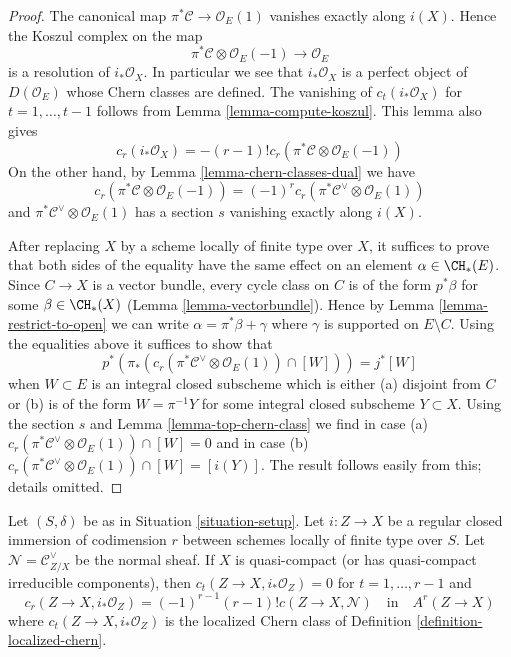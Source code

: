 \begin{proof}
The canonical map $\pi^*\mathcal{C} \to \mathcal{O}_E(1)$ vanishes
exactly along $i(X)$. Hence the Koszul complex on the map
$$
\pi^*\mathcal{C} \otimes \mathcal{O}_E(-1) \to \mathcal{O}_E
$$
is a resolution of $i_*\mathcal{O}_X$. In particular we see that
$i_*\mathcal{O}_X$ is a perfect object of $D(\mathcal{O}_E)$
whose Chern classes are defined. The vanishing of $c_t(i_*\mathcal{O}_X)$
for $t = 1, \ldots, t - 1$ follows from Lemma \ref{lemma-compute-koszul}.
This lemma also gives
$$
c_r(i_*\mathcal{O}_X) = - (r - 1)!
c_r(\pi^*\mathcal{C} \otimes \mathcal{O}_E(-1))
$$
On the other hand, by Lemma \ref{lemma-chern-classes-dual} we have
$$
c_r(\pi^*\mathcal{C} \otimes \mathcal{O}_E(-1)) =
(-1)^r c_r(\pi^*\mathcal{C}^\vee \otimes \mathcal{O}_E(1))
$$
and $\pi^*\mathcal{C}^\vee \otimes \mathcal{O}_E(1)$ has a section $s$
vanishing exactly along $i(X)$.

\medskip\noindent
After replacing $X$ by a scheme locally of finite type over $X$,
it suffices to prove that both sides of the equality have the
same effect on an element $\alpha \in \CH_*(E)$. Since $C \to X$
is a vector bundle, every cycle class on $C$ is of the form $p^*\beta$
for some $\beta \in \CH_*(X)$ (Lemma \ref{lemma-vectorbundle}).
Hence by Lemma \ref{lemma-restrict-to-open}
we can write $\alpha = \pi^*\beta + \gamma$ where $\gamma$
is supported on $E \setminus C$. Using the equalities above
it suffices to show that
$$
p^*(\pi_*(c_r(\pi^*\mathcal{C}^\vee \otimes \mathcal{O}_E(1)) \cap [W])) =
j^*[W]
$$
when $W \subset E$ is an integral closed subscheme which
is either (a) disjoint from $C$ or (b) is of the form $W = \pi^{-1}Y$
for some integral closed subscheme $Y \subset X$.
Using the section $s$ and Lemma \ref{lemma-top-chern-class} we find
in case (a) $c_r(\pi^*\mathcal{C}^\vee \otimes \mathcal{O}_E(1)) \cap [W] = 0$
and in case (b)
$c_r(\pi^*\mathcal{C}^\vee \otimes \mathcal{O}_E(1)) \cap [W] = [i(Y)]$.
The result follows easily from this; details omitted.
\end{proof}

\begin{lemma}
\label{lemma-agreement-with-loc-chern}
Let $(S, \delta)$ be as in Situation \ref{situation-setup}. Let $i : Z \to X$
be a regular closed immersion of codimension $r$
between schemes locally of finite type over $S$.
Let $\mathcal{N} = \mathcal{C}_{Z/X}^\vee$ be the normal sheaf. If $X$
is quasi-compact (or has quasi-compact irreducible components), then
$c_t(Z \to X, i_*\mathcal{O}_Z) = 0$ for $t = 1, \ldots, r - 1$ and
$$
c_r(Z \to X, i_*\mathcal{O}_Z) = (-1)^{r - 1} (r - 1)! c(Z \to X, \mathcal{N})
\quad\text{in}\quad
A^r(Z \to X)
$$
where $c_t(Z \to X, i_*\mathcal{O}_Z)$
is the localized Chern class
of Definition \ref{definition-localized-chern}.
\end{lemma}

